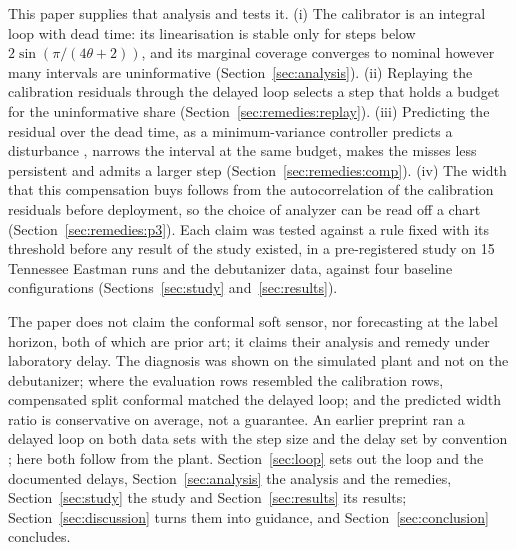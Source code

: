 This paper supplies that analysis and tests it. (i) The calibrator is an integral loop with dead
time: its linearisation is stable only for steps below $2\sin(\pi/(4\theta+2))$, and its marginal
coverage converges to nominal however many intervals are uninformative
(Section~\ref{sec:analysis}). (ii) Replaying the calibration residuals through the delayed loop
selects a step that holds a budget for the uninformative share (Section~\ref{sec:remedies:replay}).
(iii) Predicting the residual over the dead time, as a minimum-variance controller predicts a
disturbance \citep{astrom1970}, narrows the interval at the same budget, makes the misses less
persistent and admits a larger step (Section~\ref{sec:remedies:comp}). (iv) The width that this
compensation buys follows
from the autocorrelation of the calibration residuals before deployment, so the choice of analyzer
can be read off a chart (Section~\ref{sec:remedies:p3}). Each claim was tested against a rule
fixed with its threshold before any result of the study existed, in a pre-registered study on 15
Tennessee Eastman runs and the debutanizer data, against four baseline configurations
(Sections~\ref{sec:study} and~\ref{sec:results}).

The paper does not claim the conformal soft sensor, nor forecasting at the label horizon, both of
which are prior art; it claims their analysis and remedy under laboratory delay. The diagnosis was
shown on the simulated plant and not on the debutanizer; where the evaluation rows resembled the
calibration rows, compensated split conformal matched the delayed loop; and the predicted width
ratio is conservative on average, not a guarantee. An earlier preprint ran a delayed loop on both data sets
with the step size and the delay set by convention \citep{busico_m1}; here both follow from the
plant. Section~\ref{sec:loop} sets out the loop and the documented delays,
Section~\ref{sec:analysis} the analysis and the remedies, Section~\ref{sec:study} the study and
Section~\ref{sec:results} its results; Section~\ref{sec:discussion} turns them into guidance, and
Section~\ref{sec:conclusion} concludes.
